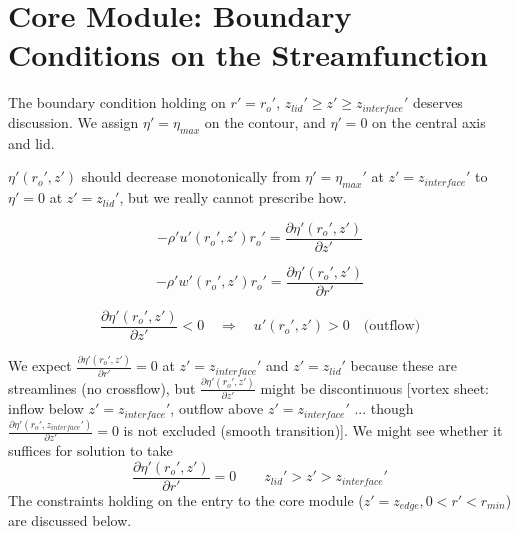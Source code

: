 \documentclass[preprint, prX]{revtex4}
\newcommand{\pd}[2]{\frac{\partial#1}{\partial#2}}
\newcommand{\rmin}{r_{min}}
\newcommand{\zedge}{z_{edge}}
\newcommand{\zinter}{z_{interface}}
\begin{document}
\section{Core Module: Boundary Conditions on the Streamfunction}

\begin{figure}[h!]
	\centering
	\def\svgwidth{0.7\columnwidth}
	
\end{figure}

The boundary condition holding on $r'=r_o'$, $z_{lid}'\geq z' \geq \zinter'$ deserves discussion. We assign $\eta'=\eta_{max}$ on the contour, and $\eta'=0$ on the central axis and lid.

$\eta'(r_o',z')$ should decrease monotonically from $\eta' = \eta_{max}'$ at $z'=\zinter'$ to $\eta'=0$ at $z'=z_{lid}'$, but we really cannot prescribe how.

\begin{equation}
-\rho' u'(r_o',z')r_o' = \pd{\eta'(r_o',z')}{z'}
\end{equation}

\begin{equation}
-\rho' w'(r_o',z')r_o' = \pd{\eta'(r_o',z')}{r'}
\end{equation}


\begin{equation}
\pd{\eta'(r_o',z')}{z'} <0 \quad \Rightarrow \quad u'(r_o',z') > 0 \quad \text{(outflow)}
\end{equation}

We expect $\pd{\eta'(r_o',z')}{r'} =0$ at $z'=\zinter'$ and $z'=z_{lid}'$ because these are streamlines (no crossflow), but $\pd{\eta'(r_o',z')}{z'}$ might be discontinuous [vortex sheet: inflow below $z'=\zinter'$, outflow above $z'=\zinter'$ ... though $\pd{\eta'(r_o',\zinter')}{z'} = 0$ is not excluded (smooth transition)]. We might see whether it suffices for solution to take
\begin{equation}
\pd{\eta'(r_o',z')}{r'} = 0 \qquad z_{lid}'> z'> \zinter'
\end{equation}
The constraints holding on the entry to the core module ($z'=\zedge, 0 < r' < \rmin$) are discussed below.
\end{document}
